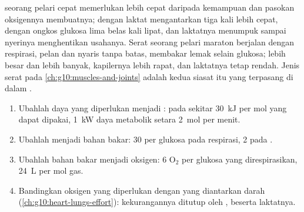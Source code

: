 \begin{example}\label{ex:g12:respiration-fermentation:muscle}
 seorang pelari cepat memerlukan  lebih cepat daripada
kemampuan  dan pasokan oksigennya membuatnya; 
dengan  laktat mengantarkan  tiga kali lebih cepat,
dengan ongkos glukosa lima belas kali lipat, dan laktatnya menumpuk
sampai nyerinya menghentikan usahanya. Serat seorang pelari maraton
berjalan dengan respirasi, pelan dan nyaris tanpa batas, membakar lemak
selain glukosa;  lebih besar dan lebih banyak, kapilernya
lebih rapat, dan laktatnya tetap rendah. Jenis serat pada
\cref{ch:g10:muscles-and-joints} adalah kedua siasat itu yang terpasang
di dalam .
\end{example}

\begin{method}\label{met:g12:respiration-fermentation:budget}
\begin{enumerate}
  \item Ubahlah daya yang diperlukan menjadi : pada sekitar
        \qty{30}{kJ} per mol  yang dapat dipakai, \qty{1}{kW} daya
        metabolik setara \qty{2}{mol}  per menit.
  \item Ubahlah  menjadi bahan bakar: 30  per glukosa pada
        respirasi, 2 pada .
  \item Ubahlah bahan bakar menjadi oksigen: 6 $\mathrm{O_2}$ per
        glukosa yang direspirasikan, \qty{24}{L} per mol gas.
  \item Bandingkan oksigen yang diperlukan dengan yang diantarkan
        darah (\cref{ch:g10:heart-lungs-effort}): kekurangannya ditutup
        oleh , beserta laktatnya.
\end{enumerate}
\end{method}

